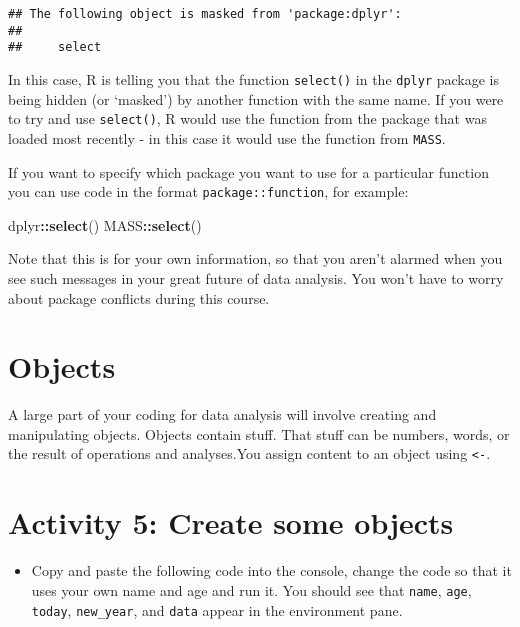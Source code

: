 \documentclass[
]{book}
\newenvironment{Shaded}{\begin{snugshade}}{\end{snugshade}}
\newcommand{\FunctionTok}[1]{\textcolor[rgb]{0.13,0.29,0.53}{\textbf{#1}}}
\newcommand{\NormalTok}[1]{#1}
\newcommand{\SpecialCharTok}[1]{\textcolor[rgb]{0.81,0.36,0.00}{\textbf{#1}}}
\providecommand{\tightlist}{%
  \setlength{\itemsep}{0pt}\setlength{\parskip}{0pt}}
\begin{document}
\begin{verbatim}
## The following object is masked from 'package:dplyr':
## 
##     select
\end{verbatim}

In this case, R is telling you that the function \texttt{select()} in the \texttt{dplyr} package is being hidden (or `masked') by another function with the same name. If you were to try and use \texttt{select()}, R would use the function from the package that was loaded most recently - in this case it would use the function from \texttt{MASS}.

If you want to specify which package you want to use for a particular function you can use code in the format \texttt{package::function}, for example:

\begin{Shaded}
\begin{Highlighting}[]
\NormalTok{dplyr}\SpecialCharTok{::}\FunctionTok{select}\NormalTok{()}
\NormalTok{MASS}\SpecialCharTok{::}\FunctionTok{select}\NormalTok{()}
\end{Highlighting}
\end{Shaded}

Note that this is for your own information, so that you aren't alarmed when you see such messages in your great future of data analysis. You won't have to worry about package conflicts during this course.

\section{Objects}\label{objects}

A large part of your coding for data analysis will involve creating and manipulating objects. Objects contain stuff. That stuff can be numbers, words, or the result of operations and analyses.You assign content to an object using \texttt{\textless{}-}.

\section{Activity 5: Create some objects}\label{activity-5-create-some-objects}

\begin{itemize}
\tightlist
\item
  Copy and paste the following code into the console, change the code so that it uses your own name and age and run it. You should see that \texttt{name}, \texttt{age}, \texttt{today}, \texttt{new\_year}, and \texttt{data} appear in the environment pane.
\end{itemize}
\end{document}

